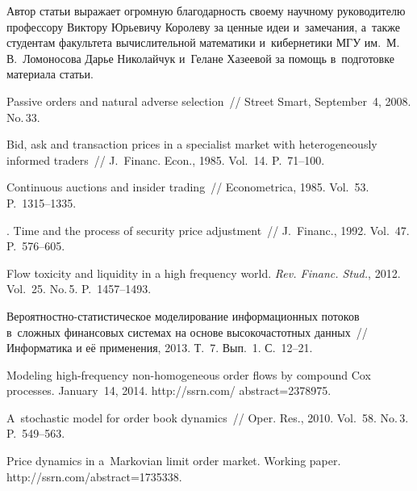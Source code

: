 \begin{multicols}{2}
\smallskip

Автор статьи выражает огромную благодарность своему научному
руководителю профессору Виктору Юрьевичу Королеву за ценные идеи и~замечания,
а~также студентам факультета вычислительной
математики и~кибернетики МГУ
им.\ М.\,В.~Ломоносова Дарье Николайчук и~Гелане
Хазеевой за помощь в~подготовке материала статьи.


{\small\frenchspacing
 {%
 \begin{thebibliography}{99}
Passive orders and natural adverse selection~//
Street Smart, September~4, 2008. No.\,33.

 Bid, ask and transaction prices in a specialist market
with heterogeneously informed traders~// J.~Financ. Econ., 1985.
Vol.~14. P.~71--100.

 Continuous auctions and insider trading~// Econometrica, 1985.
Vol.~53. P.~1315--1335.

. Time and the process of security price adjustment~//
J.~Financ., 1992. Vol.~47. P.~576--605.

Flow toxicity and liquidity in a high frequency world.
\textit{Rev. Financ. Stud.}, 2012. Vol.~25. No.\,5. P.~1457--1493.

Ве\-ро\-ят\-ност\-но-ста\-ти\-сти\-че\-ское моделирование информационных потоков
   в~сложных финансовых системах на основе высокочастотных данных~//
  Информатика и её применения, 2013. Т.~7. Вып.~1. С.~12--21.

Modeling high-frequency non-homogeneous order flows by compound Cox processes.
January~14, 2014. %
{\sf http://ssrn.com/ abstract=2378975}.


 A~stochastic model for order book dynamics~//
Oper. Res., 2010. Vol.~58. No.\,3. P.~549--563.

 Price dynamics in a~Mar\-ko\-vian limit order market.
Working paper.
{\sf http://ssrn.com/\linebreak abstract=1735338}.


\end{thebibliography}}}
\end{multicols}
